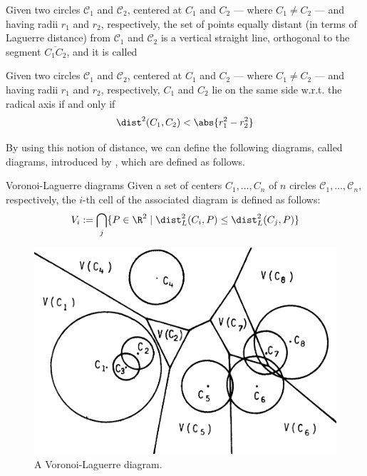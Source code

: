 \documentclass[a4paper, 12pt]{report}
\begin{document}
    \begin{framedlem}{}
        Given two circles $\mathscr C_1$ and $\mathscr C_2$, centered at $C_1$ and $C_2$ --- where $C_1 \neq C_2$ --- and having radii $r_1$ and $r_2$, respectively, the set of points equally distant (in terms of Laguerre distance) from $\mathscr C_1$ and $\mathscr C_2$ is a vertical straight line, orthogonal to the segment $\overline{C_1 C_2}$, and it is called 
    \end{framedlem}


    \begin{framedlem}{}
        Given two circles $\mathscr C_1$ and $\mathscr C_2$, centered at $C_1$ and $C_2$ --- where $C_1 \neq C_2$ --- and having radii $r_1$ and $r_2$, respectively, $C_1$ and $C_2$ lie on the same side w.r.t. the radical axis if and only if $$\dist^2(C_1, C_2) < \abs{r_1^2 - r_2^2}$$
    \end{framedlem}


    By using this notion of distance, we can define the following diagrams, called  diagrams, introduced by \textcite{imai}, which are defined as follows.

    \begin{frameddefn}{Voronoi-Laguerre diagrams}
        Given a set of centers $C_1, \ldots, C_n$ of $n$ circles $\mathscr C_1, \ldots, \mathscr C_n$, respectively, the $i$-th cell of the associated  diagram is defined as follows: $$V_i := \bigcap_j\{P \in \R^2 \mid \dist_L^2(C_i, P) \le \dist_L^2(C_j, P)\}$$
    \end{frameddefn}
     
    \begin{figure}[H]
        \centering
        \includegraphics[scale=0.35]{../assets/voronoi_laguerre.png}
        
        \caption{A Voronoi-Laguerre diagram.} \label{voronoi_laguerre}
    \end{figure}
\end{document}
